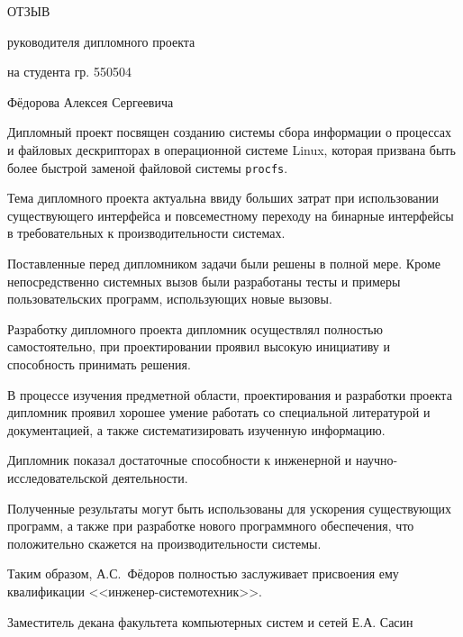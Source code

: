 


\centerline{ОТЗЫВ}
\centerline{руководителя дипломного проекта}
\centerline{на студента гр. 550504}
\centerline{Фёдорова Алексея Сергеевича}
\vspace{\baselineskip}

Дипломный проект посвящен созданию системы сбора информации о процессах и
файловых дескрипторах в операционной системе Linux, которая призвана быть более
быстрой заменой файловой системы \texttt{procfs}.

Тема дипломного проекта актуальна ввиду больших затрат при использовании
существующего интерфейса и повсеместному переходу на бинарные интерфейсы в
требовательных к производительности системах.

Поставленные перед дипломником задачи были решены в полной мере. Кроме
непосредственно системных вызов были разработаны тесты и примеры
пользовательских программ, использующих новые вызовы.

Разработку дипломного проекта дипломник осуществлял полностью самостоятельно, при
проектировании проявил высокую инициативу и способность принимать решения.

В процессе изучения предметной области, проектирования и разработки проекта
дипломник проявил хорошее умение работать со специальной литературой и
документацией, а также систематизировать изученную информацию.

Дипломник показал достаточные способности к инженерной и
научно-исследовательской деятельности.

Полученные результаты могут быть использованы для ускорения существующих
программ, а также при разработке нового программного обеспечения, что
положительно скажется на производительности системы.

Таким образом, А.С.~Фёдоров полностью заслуживает присвоения ему квалификации
<<инженер-системотехник>>.

\vspace{\baselineskip}
\noindent
Заместитель декана факультета компьютерных систем и сетей \hfill Е.А. Сасин


